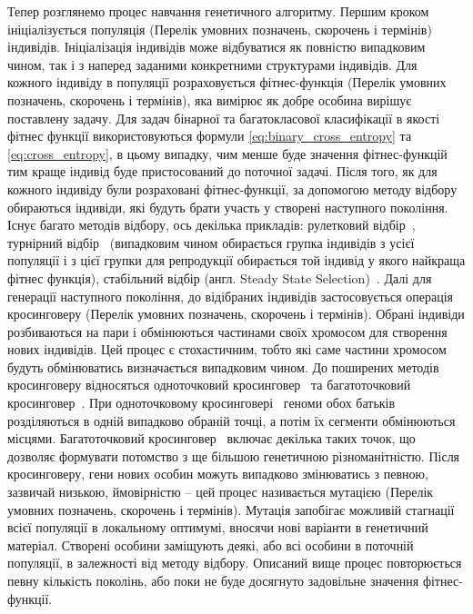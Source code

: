 Тепер розглянемо процес навчання генетичного алгоритму. Першим кроком ініціалізується популяція (Перелік умовних позначень, скорочень і термінів) індивідів. Ініціалізація індивідів може відбуватися як повністю випадковим чином, так і з наперед заданими конкретними структурами індивідів. Для кожного індивіду в популяції розраховується фітнес-функція (Перелік умовних позначень, скорочень і термінів), яка вимірює як добре особина вирішує поставлену задачу. Для задач бінарної та багатокласової класифікації в якості фітнес функції використовуються формули \ref{eq:binary_cross_entropy} та \ref{eq:cross_entropy}, в цьому випадку, чим менше буде значення фітнес-функцій тим краще індивід буде пристосований до поточної задачі. Після того, як для кожного індивіду були розраховані фітнес-функції, за допомогою методу відбору обираються індивіди, які будуть брати участь у створені наступного покоління. Існує багато методів відбору, ось декілька прикладів: рулетковий відбір~\cite{ct2}, турнірний відбір~\cite{ct3} (випадковим чином обирається групка індивідів з усієї популяції і з цієї групки для репродукції обирається той індивід у якого найкраща фітнес функція), стабільний відбір (англ. Steady State Selection)~\cite{ct5}. Далі для генерації наступного покоління, до відібраних індивідів застосовується операція кросинговеру (Перелік умовних позначень, скорочень і термінів). Обрані індивіди розбиваються на пари і обмінюються частинами своїх хромосом для створення нових індивідів. Цей процес є стохастичним, тобто які саме частини хромосом будуть обмінюватись визначається випадковим чином. До поширених методів кросинговеру відносяться одноточковий кросинговер~\cite{ct10} та багатоточковий кросинговер~\cite{ct11}. При одноточковому кросинговері~\cite{ct10} геноми обох батьків розділяються в одній випадково обраній точці, а потім їх сегменти обмінюються місцями. Багатоточковий кросинговер~\cite{ct11} включає декілька таких точок, що дозволяє формувати потомство з ще більшою генетичною різноманітністю. Після кросинговеру, гени нових особин можуть випадково змінюватись з певною, зазвичай низькою, ймовірністю -- цей процес називається мутацією (Перелік умовних позначень, скорочень і термінів). Мутація запобігає можливій стагнації всієї популяції в локальному оптимумі, вносячи нові варіанти в генетичний матеріал. Створені особини заміщують деякі, або всі особини в поточній популяції, в залежності від методу відбору. Описаний вище процес повторюється певну кількість поколінь, або поки не буде досягнуто задовільне значення фітнес-функції.

